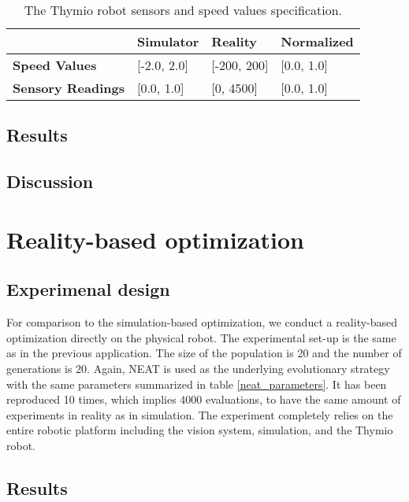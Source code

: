 \begin{table}[H]
\begin{tabular}{llll}
\centering
\hline
\textbf{}                            & \textbf{Simulator}   & \textbf{Reality}  & \textbf{Normalized}  \\ \hline
\textbf{Speed Values}                & {[}-2.0, 2.0{]}       & {[}-200, 200{]}      & {[}0.0, 1.0{]} \\
\textbf{Sensory Readings}            & {[}0.0, 1.0{]}        & {[}0, 4500{]}        & {[}0.0, 1.0{]} \\
\end{tabular}
\caption{The Thymio robot sensors and speed values specification.}
\label{tab:neat_parameters}
\end{table}

\subsection{Results}

\subsection{Discussion}

\section{Reality-based optimization}

\subsection{Experimenal design}

For comparison to the simulation-based optimization, we conduct a reality-based optimization directly on the physical robot. The experimental set-up is the same as in the previous application. The size of the population is 20 and the number of generations is 20. Again, NEAT is used as the underlying evolutionary strategy with the same parameters summarized in table \ref{neat_parameters}. It has been reproduced 10 times, which implies 4000 evaluations, to have the same amount of experiments in reality as in simulation. The experiment completely relies on the entire robotic platform including the vision system, simulation, and the Thymio robot.

\subsection{Results}

